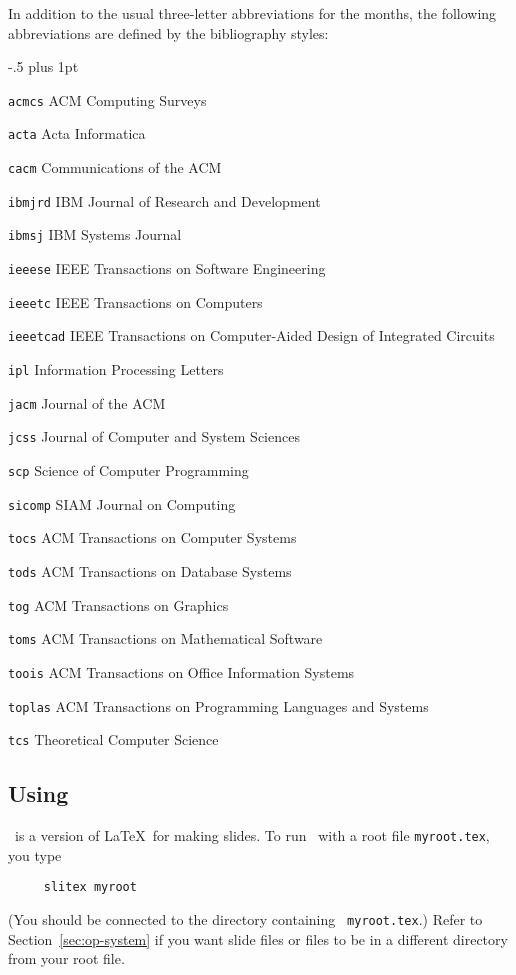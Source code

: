 In addition to the usual three-letter abbreviations for the months, the
following abbreviations are defined by the bibliography styles:
\begin{list}{}{ \itemindent-.5\leftmargin
       \itemsep=2pt plus 1pt
       \let\makelabel\descriptionlabel}\it
\item[\tt acmcs] ACM Computing Surveys
\item[\tt acta] Acta Informatica
\item[\tt cacm] Communications of the ACM
\item[\tt ibmjrd] IBM Journal of Research and Development
\item[\tt ibmsj] IBM Systems Journal
\item[\tt ieeese] IEEE Transactions on Software Engineering
\item[\tt ieeetc] IEEE Transactions on Computers
\item[\tt ieeetcad]
 IEEE Transactions on Computer-Aided Design of Integrated Circuits
\item[\tt ipl] Information Processing Letters
\item[\tt jacm] Journal of the ACM
\item[\tt jcss] Journal of Computer and System Sciences
\item[\tt scp] Science of Computer Programming
\item[\tt sicomp] SIAM Journal on Computing
\item[\tt tocs] ACM Transactions on Computer Systems
\item[\tt tods] ACM Transactions on Database Systems
\item[\tt tog] ACM Transactions on Graphics
\item[\tt toms] ACM Transactions on Mathematical Software
\item[\tt toois] ACM Transactions on Office Information Systems
\item[\tt toplas] ACM Transactions on Programming Languages and Systems
\item[\tt tcs] Theoretical Computer Science
\end{list}


\subsection{Using \SLiTeX}

\SLiTeX\ is a version of \LaTeX\ for making slides.
To run \SLiTeX\  with a root file \mbox{\tt myroot.tex}, you type
\begin{verbatim}
     slitex myroot
\end{verbatim}
(You should be connected to the directory containing \mbox{\tt
myroot.tex}.) Refer to Section~\ref{sec:op-system} if you want slide
files or \hbox{\verb||} files to be in a different directory from
your root file.

